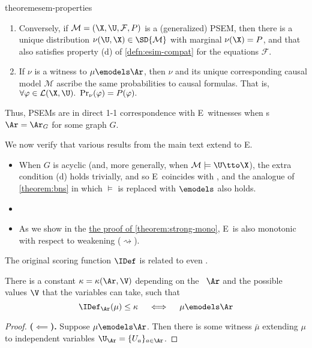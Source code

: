 \begin{subappendices}
{{\begin{linked}{theorem}{esem-properties}
\begin{enumerate}[wide,label={(\alph*)}]
    \item
    Conversely, if $\mathcal M = (\X,\U,\mathcal F, P)$ is a (generalized) PSEM, 
    then there is a unique distribution $\nu(\U,\X) \in \SD{\mathcal M}$
    with marginal $\nu(\X) = P$,
    and that also satisfies property (d) of \cref{defn:esim-compat} for the equations $\mathcal F$.
    \item
    If $\nu$ is a witness to $\mu \emodels \Ar$, then 
    $\nu$ and its unique corresponding causal model $\mathcal M$
    ascribe the same probabilities to causal formulas. That is,
    $
        \forall \varphi \in \mathcal L(\X,\U). ~
        \Pr_{\nu}(\varphi) = P(\varphi).
    $
    \end{enumerate}
\end{linked}
}%
Thus, PSEMs are in direct 1-1 correspondence with E\scibility\ witnesses when \hgraph s $\Ar = \Ar_G$ for some graph $G$.

We now verify that various results from the main text extend to E\Scibility. 
\begin{itemize}
    \item[{[\cref{theorem:bns}]}]
    When $G$ is acyclic
    (and, more generally, when $\mathcal M \models \U \tto \X$), 
    the extra condition (d) holds trivially, and so
    E\scibility\ coincides with \scibility, and the analogue of \cref{theorem:bns} in which $\models$ is replaced with $\emodels$ also holds. 
    
    \item [{$\vdots$}]
        
    \item[{[\cref{theorem:strong-mono}]}]
    As we show in the \hyperref[proof:strong-mono]{the proof of \cref*{theorem:strong-mono}}, E\Scibility\ is also monotonic with respect to weakening ($\rightsquigarrow$). 
\end{itemize}


The original scoring function $\IDef$ is related to even \scibility. 

\begin{conj}
    There is a constant $\kappa = \kappa(\Ar, \V)$ depending on the \hgraph\ $\Ar$ and the possible values $\V$ that the variables can take, such that
    \[
        \IDef_{\Ar}(\mu) \le \kappa
        \quad\iff\quad
        \mu \emodels \Ar  
    \] 
\end{conj}
\begin{proof}
    \textbf{($\impliedby$).}
    Suppose $\mu \emodels \Ar$. Then there is some witness $\bar\mu$ extending $\mu$ to independent variables $\U_\Ar = \{ U_a \}_{a \in \Ar}$. 


\end{proof}}
\end{subappendices}
